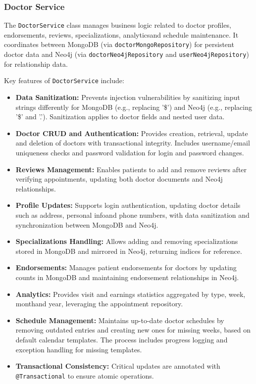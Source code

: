 \subsubsection{Doctor Service}

The \texttt{DoctorService} class manages business logic related to doctor profiles, endorsements, reviews, specializations, analyticsand schedule maintenance. It coordinates between MongoDB (via \texttt{doctorMongoRepository}) for persistent doctor data and Neo4j (via \texttt{doctorNeo4jRepository} and \texttt{userNeo4jRepository}) for relationship data.

Key features of \texttt{DoctorService} include:
\begin{itemize}
	\item \textbf{Data Sanitization:} Prevents injection vulnerabilities by sanitizing input strings differently for MongoDB (e.g., replacing '\$') and Neo4j (e.g., replacing '\$' and '.'). Sanitization applies to doctor fields and nested user data.
	
	\item \textbf{Doctor CRUD and Authentication:} Provides creation, retrieval, update and deletion of doctors with transactional integrity. Includes username/email uniqueness checks and password validation for login and password changes.  
	
	\item \textbf{Reviews Management:} Enables patients to add and remove reviews after verifying appointments, updating both doctor documents and Neo4j relationships.
	
	\item \textbf{Profile Updates:} Supports login authentication, updating doctor details such as address, personal infoand phone numbers, with data sanitization and synchronization between MongoDB and Neo4j.
	
	\item \textbf{Specializations Handling:} Allows adding and removing specializations stored in MongoDB and mirrored in Neo4j, returning indices for reference.
	
	\item \textbf{Endorsements:} Manages patient endorsements for doctors by updating counts in MongoDB and maintaining endorsement relationships in Neo4j.
	
	\item \textbf{Analytics:} Provides visit and earnings statistics aggregated by type, week, monthand year, leveraging the appointment repository.
	
	\item \textbf{Schedule Management:} Maintains up-to-date doctor schedules by removing outdated entries and creating new ones for missing weeks, based on default calendar templates. The process includes progress logging and exception handling for missing templates.
	
	\item \textbf{Transactional Consistency:} Critical updates are annotated with \texttt{@Transactional} to ensure atomic operations.
\end{itemize}

